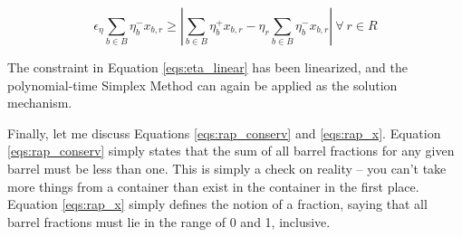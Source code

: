 \begin{equation}
\label{eqs:eta_linear}
\epsilon_{\eta} \sum_{b \in B} \eta_{b}^{-} x_{b,r} \geq
\left| \sum_{b \in B} \eta_{b}^{+} x_{b,r}
- \eta_{r} \sum_{b \in B} \eta_{b}^{-} x_{b,r} \right|
\: \forall \: r \in R
\end{equation}

The constraint in Equation \ref{eqs:eta_linear} has been linearized, and the
polynomial-time Simplex Method can again be applied as the solution mechanism. 

Finally, let me discuss Equations \ref{eqs:rap_conserv} and \ref{eqs:rap_x}.
Equation \ref{eqs:rap_conserv} simply states that the sum of all barrel
fractions for any given barrel must be less than one. This is simply a check on
reality -- you can't take more things from a container than exist in the
container in the first place. Equation \ref{eqs:rap_x} simply defines the notion of
a fraction, saying that all barrel fractions must lie in the range of 0 and 1,
inclusive.
